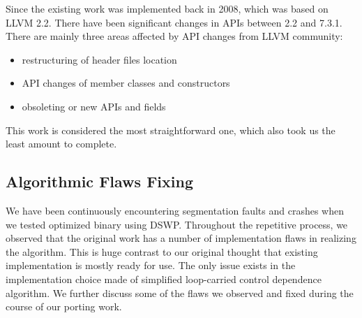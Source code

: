 \documentclass[letterpaper, 10 pt, conference]{ieeeconf}  %
\begin{document}
Since the existing work \cite{c2} was implemented back in 2008, which was based on LLVM 2.2. There have been significant changes in APIs between 2.2 and 7.3.1. There are mainly three areas affected by API changes from LLVM community:

\begin{itemize}
\item restructuring of header files location 
\item API changes of member classes and constructors
\item obsoleting or new APIs and fields 
\end{itemize}

This work is considered the most straightforward one, which also took us the least amount to complete. 


\subsection{Algorithmic Flaws Fixing}
We have been continuously encountering segmentation faults and crashes when we tested optimized binary using DSWP. Throughout the repetitive process, we observed that the original work \cite{c2} has a number of implementation flaws in realizing the algorithm. This is huge contrast to our original thought that existing implementation is mostly ready for use. The only issue exists in the implementation choice made of simplified loop-carried control dependence algorithm. We further discuss some of the flaws we observed and fixed during the course of our porting work.
\end{document}

